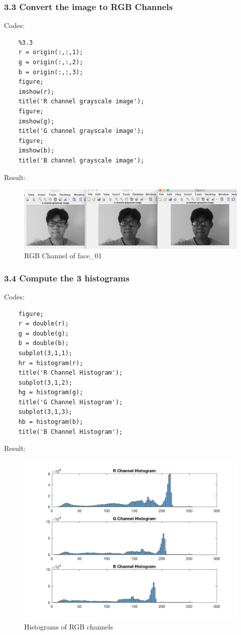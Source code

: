 \documentclass{article}
\begin{document}
\subsubsection*{3.3 Convert the image to RGB Channels}
Codes:
\begin{lstlisting}
    %3.3
    r = origin(:,:,1);
    g = origin(:,:,2);
    b = origin(:,:,3);
    figure;
    imshow(r);
    title('R channel grayscale image');
    figure;
    imshow(g);
    title('G channel grayscale image');
    figure;
    imshow(b);
    title('B channel grayscale image');
\end{lstlisting}
Result:
\begin{figure}[htbp]
    \centering
    \includegraphics[scale = 0.3]{fig2.jpg}
    \caption{RGB Channel of face\_01}
    \label{fig2}
\end{figure}

\subsubsection*{3.4 Compute the 3 histograms}
Codes:
\begin{lstlisting}
    figure;
    r = double(r);
    g = double(g);
    b = double(b);
    subplot(3,1,1);
    hr = histogram(r);
    title('R Channel Histogram');
    subplot(3,1,2);
    hg = histogram(g);
    title('G Channel Histogram');
    subplot(3,1,3);
    hb = histogram(b);
    title('B Channel Histogram');
\end{lstlisting}
Result:
\begin{figure}[htbp]
    \centering
    \includegraphics[scale = 0.3]{fig3.jpg}
    \caption{Histograms of RGB channels}
    \label{fig3}
\end{figure}
\end{document}
